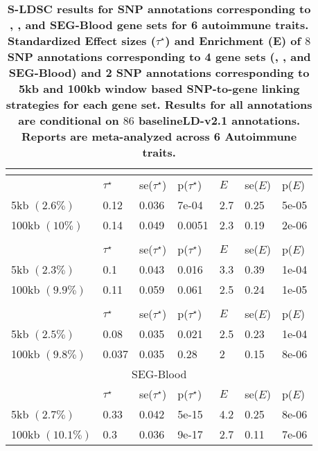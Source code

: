 \newpage
\begin{table}
\caption{\bf{S-LDSC results for SNP annotations corresponding to \Robospan{}, \pRobospan{}, \Corspan{} and SEG-Blood gene sets for 6 autoimmune traits. Standardized Effect sizes ($\tau^{\star}$) and Enrichment (E) of $8$ SNP annotations corresponding to 4 gene sets (\Robospan{}, \pRobospan{}, \Corspan{} and SEG-Blood\cite{Finucane2018}) and 2 SNP annotations corresponding to 5kb and 100kb window based SNP-to-gene linking strategies for each gene set. Results for all annotations are conditional on $86$ baselineLD-v2.1 annotations. Reports are meta-analyzed across 6 Autoimmune traits.}}
\label{tab:Robocov_marginal_immune}  
\begin{tabular}[c]{|p{1.5cm}|p{0.5cm}|p{0.8cm}|p{0.8cm}|p{0.5cm}|p{0.8cm}|p{0.8cm}|} 
\hline
 \multicolumn{7}{c}{\Robospan{}}  \\ \hline
& $\tau^{\star}$ & se($\tau^{\star}$) & p($\tau^{\star}$) & $E$ & se($E$) & p($E$) \\
\hline
\multirow{1}{16em}{5kb $(2.6\%)$} & 0.12 & 0.036 & 7e-04 & 2.7 & 0.25 & 5e-05 \\
\multirow{1}{16em}{100kb $(10\%)$} & 0.14 & 0.049 & 0.0051 & 2.3 & 0.19 & 2e-06 \\
\hline 
 \multicolumn{7}{c}{\pRobospan{}}  \\ \hline
 & $\tau^{\star}$ & se($\tau^{\star}$) & p($\tau^{\star}$) & $E$ & se($E$) & p($E$) \\
\hline
\multirow{1}{16em}{5kb $(2.3\%)$} & 0.1 & 0.043 & 0.016 & 3.3 & 0.39 & 1e-04 \\
\multirow{1}{16em}{100kb $(9.9\%)$} & 0.11 & 0.059 & 0.061 & 2.5 & 0.24 & 1e-05 \\
\hline 
\multicolumn{7}{c}{\Corspan{}}  \\ \hline
 & $\tau^{\star}$ & se($\tau^{\star}$) & p($\tau^{\star}$) & $E$ & se($E$) & p($E$) \\
\hline
\multirow{1}{16em}{5kb $(2.5\%)$} & 0.08 & 0.035 & 0.021 & 2.5 & 0.23 & 1e-04 \\
\multirow{1}{16em}{100kb $(9.8\%)$} & 0.037 & 0.035 & 0.28 &   2 & 0.15 & 8e-06 \\
 \hline 
\multicolumn{7}{c}{SEG-Blood}  \\ \hline
 & $\tau^{\star}$ & se($\tau^{\star}$) & p($\tau^{\star}$) & $E$ & se($E$) & p($E$) \\
\hline
\multirow{1}{16em}{5kb $(2.7\%)$} & 0.33 & 0.042 & 5e-15 & 4.2 & 0.25 & 8e-06 \\
\multirow{1}{16em}{100kb $(10.1\%)$} & 0.3 & 0.036 & 9e-17 & 2.7 & 0.11 & 7e-06 \\
 \hline
\end{tabular}
\end{table}

